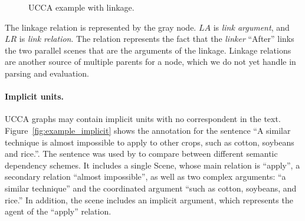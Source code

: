 \documentclass[11pt,a4paper]{article}
\newcommand{\figref}[1]{Figure~\ref{#1}}
\begin{document}
\begin{figure}[H]
  \centering
  \caption{UCCA example with linkage.}
  \label{fig:example_linkage}
\end{figure}

The linkage relation is represented by the gray node.
$LA$ is \emph{link argument}, and $LR$ is \emph{link relation}.
The relation represents the fact that the \emph{linker} ``After'' links the two parallel scenes
that are the arguments of the linkage.
Linkage relations are another source of multiple parents for a node, which we do not yet handle
in parsing and evaluation.

\paragraph{Implicit units.}

UCCA graphs may contain implicit units with no correspondent in the text.
\figref{fig:example_implicit} shows the annotation for the sentence
``A similar technique is almost impossible to apply to other crops, such as cotton, soybeans and rice.''.
The sentence was used by \cite{oepen2015semeval} to compare between different semantic
dependency schemes.
It includes a single Scene, whose main relation is ``apply'', a secondary relation ``almost impossible'', as well as two complex arguments: ``a similar technique'' and the coordinated argument ``such as cotton, soybeans, and rice.''
In addition, the scene includes an implicit argument, which represents the agent of the
``apply'' relation.
\end{document}
